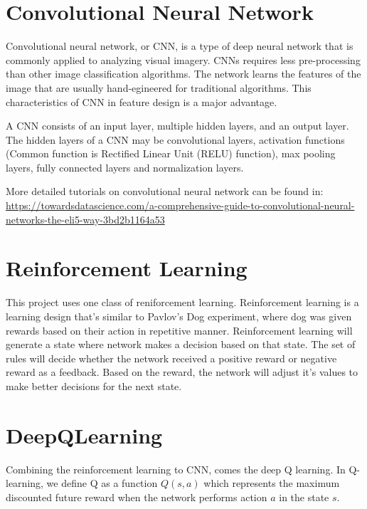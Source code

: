 \documentclass[]{article}
\begin{document}
\section{Convolutional Neural
Network}\label{convolutional-neural-network}

Convolutional neural network, or CNN, is a type of deep neural network
that is commonly applied to analyzing visual imagery. CNNs requires less
pre-processing than other image classification algorithms. The network
learns the features of the image that are usually hand-egineered for
traditional algorithms. This characteristics of CNN in feature design is
a major advantage.

A CNN consists of an input layer, multiple hidden layers, and an output
layer. The hidden layers of a CNN may be convolutional layers,
activation functions (Common function is Rectified Linear Unit (RELU)
function), max pooling layers, fully connected layers and normalization
layers.

More detailed tutorials on convolutional neural network can be found in:
\url{https://towardsdatascience.com/a-comprehensive-guide-to-convolutional-neural-networks-the-eli5-way-3bd2b1164a53}

\section{Reinforcement Learning}\label{reinforcement-learning}

This project uses one class of reniforcement learning. Reinforcement
learning is a learning design that's similar to Pavlov's Dog experiment,
where dog was given rewards based on their action in repetitive manner.
Reinforcement learning will generate a state where network makes a
decision based on that state. The set of rules will decide whether the
network received a positive reward or negative reward as a feedback.
Based on the reward, the network will adjust it's values to make better
decisions for the next state.

\section{DeepQLearning}\label{deepqlearning}

Combining the reinforcement learning to CNN, comes the deep Q learning.
In Q-learning, we define Q as a function \(Q(s,a)\) which represents the
maximum discounted future reward when the network performs action \(a\)
in the state \(s\).
\end{document}
